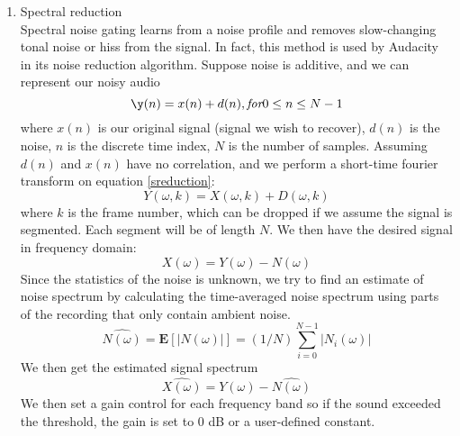 \begin{enumerate}
	\item Spectral reduction\\
	Spectral noise gating learns from a noise profile and removes slow-changing tonal noise or hiss from the signal. In 
	fact, this method is used by Audacity in its noise reduction algorithm. \cite{audacity}
	Suppose noise is additive, and we can represent our noisy audio 
	\begin{equation} \label{sreduction}
		\y(n) = x(n) + d(n), \textit{for} 0 \leq n \leq N-1 
	\end{equation}
	where $x(n)$ is our original signal (signal we wish to recover), $d(n)$ is the noise, $n$ is the discrete time index,
	$N$ is the number of samples. 
	Assuming $d(n)$ and $x(n)$ have no correlation, and we perform a short-time fourier transform on equation \ref{sreduction}:
	\[Y(\omega,k)= X(\omega,k) + D(\omega,k)\]
	where $k$ is the frame number, which can be dropped if we assume the signal is segmented. Each segment will be of
	length $N$. We then have the desired signal in frequency domain:
	\[X(\omega) = Y(\omega) - N(\omega)\]
	Since the statistics of the noise is unknown, we try to find an estimate of noise spectrum by calculating the time-averaged
	noise spectrum using parts of the recording that only contain ambient noise. \cite{reductionmanual}
	\[\hat{N(\omega)} = \textbf{E}[|N(\omega)|] = (1/N)\sum_{i=0}^{N-1}|N_i(\omega)|\]
	We then get the estimated signal spectrum
	\[\hat{X(\omega)} = Y(\omega) - \hat{N(\omega)}\]
	We then set a gain control for each frequency band so if the sound exceeded the threshold, the gain is set to 0 dB or a user-defined
	constant.
\end{enumerate}

